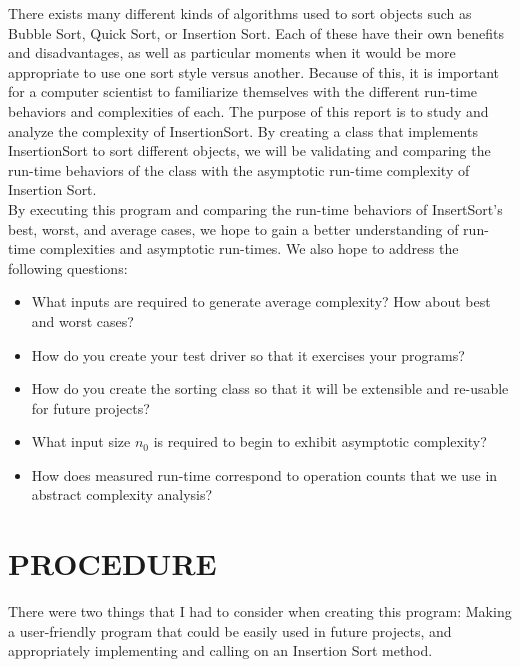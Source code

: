 \documentclass[12pt]{article}
\begin{document}
	
	
	There exists many different kinds of algorithms used to sort objects such as Bubble Sort, Quick Sort, or Insertion Sort. Each of these have their own benefits and disadvantages, as well as particular moments when it would be more appropriate to use one sort style versus another. Because of this, it is important for a computer scientist to familiarize themselves with the different run-time behaviors and complexities of each. The purpose of this report is to study and analyze the complexity of InsertionSort. By creating a class that implements InsertionSort to sort different objects, we will be validating and comparing the run-time behaviors of the class with the asymptotic run-time complexity of Insertion Sort.\\
	
	By executing this program and comparing the run-time behaviors of InsertSort's best, worst, and average cases, we hope to gain a better understanding of run-time complexities and asymptotic run-times. We also hope to address the following questions:
	
	
\begin{itemize}

	\item What inputs are required to generate average complexity? How about best and worst cases?
	\item How do you create your test driver so that it exercises your programs?
	\item How do you create the sorting class so that it will be extensible and re-usable for future projects? 
	\item What input size $n_0$ is required to begin to exhibit asymptotic complexity?
	\item How does measured run-time correspond to operation counts that we use in abstract complexity analysis? 
		
\end{itemize}


\section*{PROCEDURE}
There were two things that I had to consider when creating this program: Making a user-friendly program that could be easily used in future projects, and appropriately implementing and calling on an Insertion Sort method. \\
\end{document}
